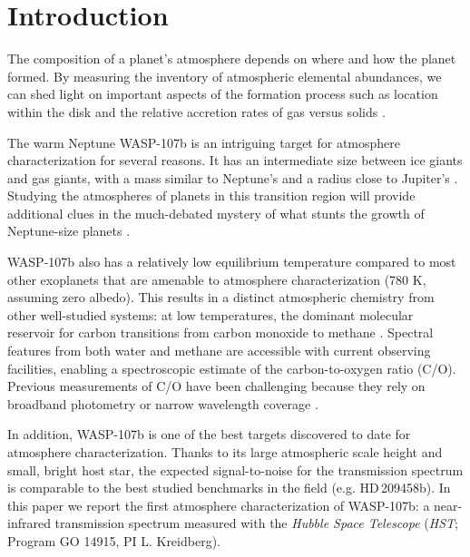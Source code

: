 \documentclass[twocolumn, trackchanges]{aastex61}
\begin{document}



\section{Introduction} \label{sec:intro}
The composition of a planet's atmosphere depends on where and how the planet formed. By measuring the inventory of atmospheric elemental abundances, we can shed light on important aspects of the formation process such as location within the disk and the relative accretion rates of gas versus solids \citep[][]{oberg11, fortney13, madhusudhan14,  mordasini16, espinoza17}.  

The warm Neptune WASP-107b is an intriguing target for atmosphere characterization for several reasons.  It has an intermediate size between ice giants and gas giants, with a mass similar to Neptune's and a radius close to Jupiter's \citep[$0.12\,M_\mathrm{Jup}$, $0.94\,R_\mathrm{Jup}$;][]{anderson17}. Studying the atmospheres of planets in this transition region will provide additional clues in the much-debated mystery of what stunts the growth of Neptune-size planets \citep[e.g][]{pollack96, dawson16, frelikh17}.  

WASP-107b also has a relatively low equilibrium temperature compared to most other exoplanets that are amenable to atmosphere characterization (780 K, assuming zero albedo).  This results in a distinct atmospheric chemistry from other well-studied systems: at low temperatures, the dominant molecular reservoir for carbon transitions from carbon monoxide to methane \citep{moses13}.  Spectral features from both water and methane are accessible with current observing facilities, enabling a spectroscopic estimate of the carbon-to-oxygen ratio (C/O). Previous measurements of C/O have been challenging because they rely on broadband photometry or narrow wavelength coverage \citep[e.g.][]{madhusudhan11, line14, benneke15, kreidberg15b}. 

In addition, WASP-107b is one of the best targets discovered to date for atmosphere characterization. Thanks to its large atmospheric scale height and small, bright host star, the expected signal-to-noise for the transmission spectrum is comparable to the best studied benchmarks in the field (e.g. HD\,209458b).  In this paper we report the first atmosphere characterization of WASP-107b: a near-infrared transmission spectrum measured with the \emph{Hubble Space Telescope} (\emph{HST}; Program GO 14915, PI L. Kreidberg).
\end{document}
